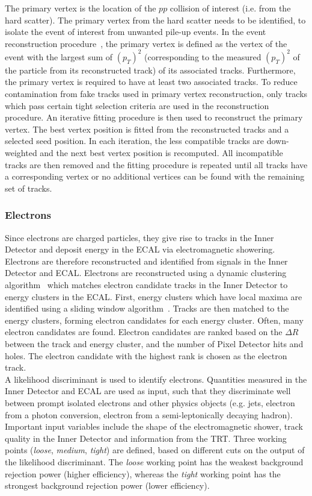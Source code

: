 The primary vertex is the location of the $pp$ collision of interest (i.e. from the hard scatter). The primary vertex from the hard scatter needs to be identified, to isolate the event of interest from unwanted pile-up events. In the event reconstruction procedure~\cite{Meloni_2016}, the primary vertex is defined as the vertex of the event with the largest sum of $(p_{T})^{2}$ (corresponding to the measured $(p_{T})^{2}$ of the particle from its reconstructed track) of its associated tracks. Furthermore, the primary vertex is required to have at least two associated tracks. To reduce contamination from fake tracks used in primary vertex reconstruction, only tracks which pass certain tight selection criteria are used in the reconstruction procedure. An iterative fitting procedure is then used to reconstruct the primary vertex. The best vertex position is fitted from the reconstructed tracks and a selected seed position. In each iteration, the less compatible tracks are down-weighted and the next best vertex position is recomputed. All incompatible tracks are then removed and the fitting procedure is repeated until all tracks have a corresponding vertex or no additional vertices can be found with the remaining set of tracks.
\subsubsection{Electrons}
Since electrons are charged particles, they give rise to tracks in the Inner Detector and deposit energy in the ECAL via electromagnetic showering. Electrons are therefore reconstructed and identified from signals in the Inner Detector and ECAL. Electrons are reconstructed using a dynamic clustering algorithm~\cite{electronRecoAndID:paper} which matches electron candidate tracks in the Inner Detector to energy clusters in the ECAL. First, energy clusters which have local maxima are identified using a sliding window algorithm~\cite{Aad:2138166}. Tracks are then matched to the energy clusters, forming electron candidates for each energy cluster. Often, many electron candidates are found. Electron candidates are ranked based on the $\Delta R$ between the track and energy cluster, and the number of Pixel Detector hits and holes. The electron candidate with the highest rank is chosen as the electron track.\\

A likelihood discriminant is used to identify electrons. Quantities measured in the Inner Detector and ECAL are used as input, such that they discriminate well between prompt isolated electrons and other physics objects (e.g. jets, electron from a photon conversion, electron from a semi-leptonically decaying hadron). Important input variables include the shape of the electromagnetic shower, track quality in the Inner Detector and information from the TRT. Three working points (\textit{loose}, \textit{medium}, \textit{tight}) are defined, based on different cuts on the output of the likelihood discriminant. The \textit{loose} working point has the weakest background rejection power (higher efficiency), whereas the \textit{tight} working point has the strongest background rejection power (lower efficiency). 

